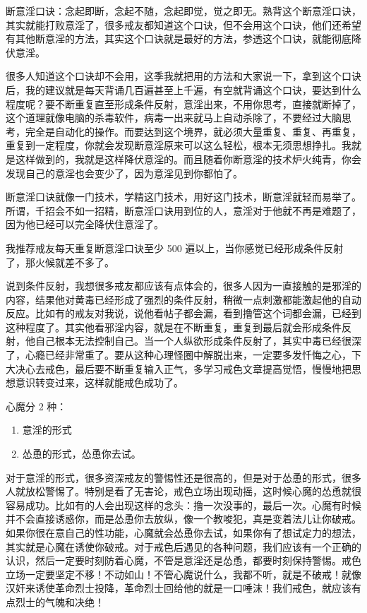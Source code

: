 \documentclass[fontset=founder]{ctexart}
\begin{document}
断意淫口诀：念起即断，念起不随，念起即觉，觉之即无。熟背这个断意淫口诀，其实就能打败意淫了，很多戒友都知道这个口诀，但不会用这个口诀，他们还希望有其他断意淫的方法，其实这个口诀就是最好的方法，参透这个口诀，就能彻底降伏意淫。

很多人知道这个口诀却不会用，这季我就把用的方法和大家说一下，拿到这个口诀后，我的建议就是每天背诵几百遍甚至上千遍，有空就背诵这个口诀，要达到什么程度呢？要不断重复直至形成条件反射，意淫出来，不用你思考，直接就断掉了，这个道理就像电脑的杀毒软件，病毒一出来就马上自动杀除了，不要经过大脑思考，完全是自动化的操作。而要达到这个境界，就必须大量重复、重复、再重复，重复到一定程度，你就会发现断意淫原来可以这么轻松，根本无须思想挣扎。我就是这样做到的，我就是这样降伏意淫的。而且随着你断意淫的技术炉火纯青，你会发现自己的意淫也会变少了，因为意淫见到你都怕了。

断意淫口诀就像一门技术，学精这门技术，用好这门技术，断意淫就轻而易举了。所谓，千招会不如一招精，断意淫口诀用到位的人，意淫对于他就不再是难题了，因为他已经可以完全降伏住意淫了。

我推荐戒友每天重复断意淫口诀至少 500 遍以上，当你感觉已经形成条件反射了，那火候就差不多了。

说到条件反射，我想很多戒友都应该有点体会的，很多人因为一直接触的是邪淫的内容，结果他对黄毒已经形成了强烈的条件反射，稍微一点刺激都能激起他的自动反应。比如有的戒友对我说，说他看帖子都会漏，看到撸管这个词都会漏，已经到这种程度了。其实他看邪淫内容，就是在不断重复，重复到最后就会形成条件反射，他自己根本无法控制自己。当一个人纵欲形成条件反射了，其实中毒已经很深了，心瘾已经非常重了。要从这种心理怪圈中解脱出来，一定要多发忏悔之心，下大决心去戒色，最后要不断重复输入正气，多学习戒色文章提高觉悟，慢慢地把思想意识转变过来，这样就能戒色成功了。

心魔分 2 种：

\begin{enumerate}
    \item 意淫的形式
    \item 怂恿的形式，怂恿你去试。
\end{enumerate}

对于意淫的形式，很多资深戒友的警惕性还是很高的，但是对于怂恿的形式，很多人就放松警惕了。特别是看了无害论，戒色立场出现动摇，这时候心魔的怂恿就很容易成功。比如有的人会出现这样的念头：撸一次没事的，最后一次。心魔有时候并不会直接诱惑你，而是怂恿你去放纵，像一个教唆犯，真是变着法儿让你破戒。如果你很在意自己的性功能，心魔就会怂恿你去试，如果你有了想试定力的想法，其实就是心魔在诱使你破戒。对于戒色后遇见的各种问题，我们应该有一个正确的认识，然后一定要时刻防着心魔，不管是意淫还是怂恿，都要时刻保持警惕。戒色立场一定要坚定不移！不动如山！不管心魔说什么，我都不听，就是不破戒！就像汉奸来诱使革命烈士投降，革命烈士回给他的就是一口唾沫！我们戒色，就应该有点烈士的气魄和决绝！
\end{document}
